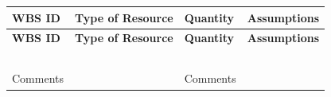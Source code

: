 \documentclass[10pt,letterpaper]{article}
\renewcommand\arraystretch{1.25}
\begin{document}
\begin{center}
\begingroup
\setlength\tabcolsep{2.0pt}
\footnotesize
\renewcommand\arraystretch{1.55}
\begin{longtable}{|>{\raggedright\arraybackslash}p{1.558in}|>{\raggedright\arraybackslash}p{1.558in}|>{\raggedright\arraybackslash}p{1.558in}|>{\raggedright\arraybackslash}p{1.558in}|}
\hline
\rowcolor{light}
\textbf{WBS ID} & \textbf{Type of Resource} & \textbf{Quantity} & \textbf{Assumptions} \\ \hline
\endfirsthead
\hline\rowcolor{light} \textbf{WBS ID} & \textbf{Type of Resource} & \textbf{Quantity} & \textbf{Assumptions} \\ \hline
\endhead
\rule{0pt}{11pt}\hspace{0pt} & \rule{0pt}{11pt}\hspace{0pt} & \rule{0pt}{11pt}\hspace{0pt} & \rule{0pt}{11pt}\hspace{0pt} \\ \hline
\rule{0pt}{11pt}\hspace{0pt} & \rule{0pt}{11pt}\hspace{0pt} & \rule{0pt}{11pt}\hspace{0pt} & \rule{0pt}{11pt}\hspace{0pt} \\ \hline
\rule{0pt}{11pt}\hspace{0pt} & \rule{0pt}{11pt}\hspace{0pt} & \rule{0pt}{11pt}\hspace{0pt} & \rule{0pt}{11pt}\hspace{0pt} \\ \hline
\rule{0pt}{11pt}\hspace{0pt} & \rule{0pt}{11pt}\hspace{0pt} & \rule{0pt}{11pt}\hspace{0pt} & \rule{0pt}{11pt}\hspace{0pt} \\ \hline
\rule{0pt}{11pt}\hspace{0pt} & \rule{0pt}{11pt}\hspace{0pt} & \rule{0pt}{11pt}\hspace{0pt} & \rule{0pt}{11pt}\hspace{0pt} \\ \hline
Comments & \rule{0pt}{11pt}\hspace{0pt} & Comments & \rule{0pt}{11pt}\hspace{0pt} \\ \hline
\end{longtable}
\endgroup
\end{center}
\end{document}
